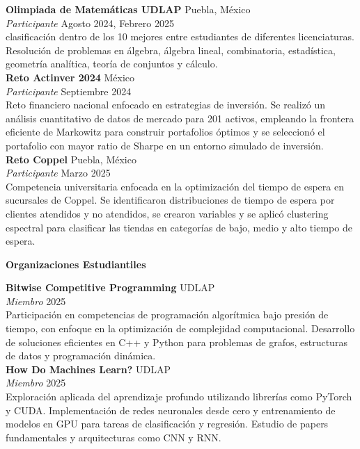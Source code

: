 \documentclass[8pt]{extarticle} %
\begin{document}
\textbf{Olimpiada de Matemáticas UDLAP} \hfill Puebla, México\\  
\textit{Participante} \hfill Agosto 2024,  Febrero 2025\\  
clasificación dentro de los 10 mejores entre estudiantes de diferentes licenciaturas. Resolución de problemas en álgebra, álgebra lineal, combinatoria, estadística, geometría analítica, teoría de conjuntos y cálculo.\\

\textbf{Reto Actinver 2024} \hfill México\\  
\textit{Participante} \hfill Septiembre 2024\\  
Reto financiero nacional enfocado en estrategias de inversión. Se realizó un análisis cuantitativo de datos de mercado para 201 activos, empleando la frontera eficiente de Markowitz para construir portafolios óptimos y se seleccionó el portafolio con mayor ratio de Sharpe en un entorno simulado de inversión.\\

\textbf{Reto Coppel} \hfill Puebla, México\\  
\textit{Participante} \hfill Marzo 2025\\  
Competencia universitaria enfocada en la optimización del tiempo de espera en sucursales de Coppel. Se identificaron distribuciones de tiempo de espera por clientes atendidos y no atendidos, se crearon variables y se aplicó clustering espectral para clasificar las tiendas en categorías de bajo, medio y alto tiempo de espera. \\

\begin{center}
\vspace{1ex}
\textbf{Organizaciones Estudiantiles}
\vspace{-1ex}
\end{center}

\textbf{Bitwise Competitive Programming} \hfill UDLAP \\
\textit{Miembro} \hfill 2025 \\
Participación en competencias de programación algorítmica bajo presión de tiempo, con enfoque en la optimización de complejidad computacional. Desarrollo de soluciones eficientes en C++ y Python para problemas de grafos, estructuras de datos y programación dinámica. \\

\textbf{How Do Machines Learn?} \hfill UDLAP \\
\textit{Miembro} \hfill 2025 \\
Exploración aplicada del aprendizaje profundo utilizando librerías como PyTorch y CUDA. Implementación de redes neuronales desde cero y entrenamiento de modelos en GPU para tareas de clasificación y regresión. Estudio de papers fundamentales y arquitecturas como CNN y RNN. \\
\end{document}
